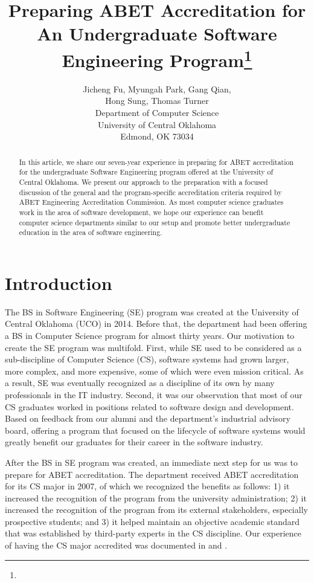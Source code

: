 \documentclass{article}
\title{Preparing ABET Accreditation for An Undergraduate Software Engineering Program\footnote{\protect}
}
\author{
Jicheng Fu, Myungah Park, Gang Qian,\\
Hong Sung, Thomas Turner\\
Department of Computer Science\\
University of Central Oklahoma\\
Edmond, OK 73034\\
\email{gqian@uco.edu}
}
\begin{document}
\maketitle

\begin{abstract}
In this article, we share our seven-year experience in preparing for ABET accreditation for the undergraduate Software Engineering program offered at the University of Central Oklahoma.  We present our approach to the preparation with a focused discussion of the general and the program-specific accreditation criteria required by ABET Engineering Accreditation Commission.  As most computer science graduates work in the area of software development, we hope our experience can benefit computer science departments similar to our setup and promote better undergraduate education in the area of software engineering.
\end{abstract}

\section{Introduction}
The BS in Software Engineering (SE) program was created at the University of Central Oklahoma (UCO) in 2014.  Before that, the department had been offering a BS in Computer Science program for almost thirty years.  Our motivation to create the SE program was multifold.  First, while SE used to be considered as a sub-discipline of Computer Science (CS), software systems had grown larger, more complex, and more expensive, some of which were even mission critical.  As a result, SE was eventually recognized as a discipline of its own by many professionals in the IT industry.  Second, it was our observation that most of our CS graduates worked in positions related to software design and development.  Based on feedback from our alumni and the department’s industrial advisory board, offering a program that focused on the lifecycle of software systems would greatly benefit our graduates for their career in the software industry. 

After the BS in SE program was created, an immediate next step for us was to prepare for ABET accreditation.  The department received ABET accreditation for its CS major in 2007, of which we recognized the benefits as follows: 1) it increased the recognition of the program from the university administration; 2) it increased the recognition of the program from its external stakeholders, especially prospective students; and 3) it helped maintain an objective academic standard that was established by third-party experts in the CS discipline.  Our experience of having the CS major accredited was documented in \cite{gourley08} and \cite{fu14}.
\end{document}
